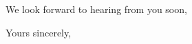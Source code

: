 \documentclass[11pt]{letter}
\begin{document}
\begin{letter}{}
We look forward to hearing from you soon,

\closing{Yours sincerely,}




\end{letter}
\end{document}
